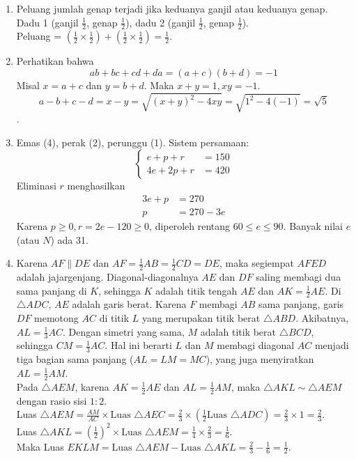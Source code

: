 \documentclass[11pt]{article}
\begin{document}
\begin{enumerate}
    \item Peluang jumlah genap terjadi jika keduanya ganjil atau keduanya genap. Dadu 1 (ganjil $\frac12$, genap $\frac12$), dadu 2 (ganjil $\frac12$, genap $\frac12$). \\[4pt] Peluang = $\left(\frac12 \times \frac12\right) + \left(\frac12 \times \frac12\right) = \frac12$.
    \item Perhatikan bahwa $$ab+bc+cd+da = (a+c)(b+d) = -1$$ Misal $x=a+c$ dan $y=b+d$. Maka $x+y=1, xy=-1$.  $$a-b+c-d = x-y = \sqrt{(x+y)^2 - 4xy} = \sqrt{1^2 - 4(-1)} = \sqrt{5}$$.
    \item Emas (4), perak (2), perunggu (1). Sistem persamaan: $$\begin{cases} e+p+r&=150\\4e+2p+r&=420\end{cases}$$ Eliminasi $r$ menghasilkan \begin{align*}3e+p&=270 \\ p &= 270-3e\end{align*} Karena $p \ge 0, r = 2e-120 \ge 0$, diperoleh rentang $60 \le e \le 90$. Banyak nilai $e$ (atau $N$) ada 31.
    \item Karena $AF \parallel DE$ dan $AF = \frac{1}{2}AB = \frac{1}{2}CD = DE$, maka segiempat $AFED$ adalah jajargenjang. Diagonal-diagonalnya $AE$ dan $DF$ saling membagi dua sama panjang di $K$, sehingga $K$ adalah titik tengah $AE$ dan $AK = \frac{1}{2} AE$. Di $\triangle ADC$, $AE$ adalah garis berat. Karena $F$ membagi $AB$ sama panjang, garis $DF$ memotong $AC$ di titik $L$ yang merupakan titik berat $\triangle ABD$. Akibatnya, $AL = \frac{1}{3} AC$. Dengan simetri yang sama, $M$ adalah titik berat $\triangle BCD$, sehingga $CM = \frac{1}{3} AC$. Hal ini berarti $L$ dan $M$ membagi diagonal $AC$ menjadi tiga bagian sama panjang ($AL = LM = MC$), yang juga menyiratkan $AL = \frac{1}{2} AM$.\\
    Pada $\triangle AEM$, karena $AK = \frac{1}{2} AE$ dan $AL = \frac{1}{2} AM$, maka $\triangle AKL \sim \triangle AEM$ dengan rasio sisi $1:2$. \\Luas $\triangle AEM = \frac{AM}{AC} \times \text{Luas } \triangle AEC = \frac{2}{3} \times (\frac{1}{2} \text{Luas } \triangle ADC) = \frac{2}{3} \times 1 = \frac{2}{3}$.\\[4pt]
    Luas $\triangle AKL = (\frac{1}{2})^2 \times \text{Luas } \triangle AEM = \frac{1}{4} \times \frac{2}{3} = \frac{1}{6}$.\\
    Maka Luas $EKLM = \text{Luas } \triangle AEM - \text{Luas } \triangle AKL = \frac{2}{3} - \frac{1}{6} = \boxed{\boxed{\frac{1}{2}}}$.
    

\end{enumerate}
\end{document}
